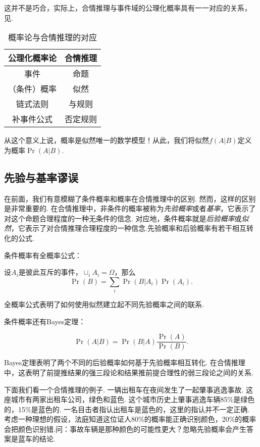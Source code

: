 这并不是巧合，实际上，合情推理与事件域的公理化概率具有一一对应的关系，见.
    \begin{table}[ht]
        \centering
        \begin{tabular}{c|c}
        公理化概率论&合情推理  \\\hline
        事件 & 命题\\
        （条件）概率 & 似然\\
        链式法则 & 与规则\\
        补事件公式 & 否定规则
        \end{tabular}
        \caption{概率论与合情推理的对应}
        \label{tab:prob}
    \end{table}

从这个意义上说，概率是似然唯一的数学模型！从此，我们将似然$f(A|B)$定义为概率$\Pr(A|B)$.

\subsection{先验与基率谬误}

在前面，我们有意模糊了条件概率和概率在合情推理中的区别. 然而，这样的区别是非常重要的. 在合情推理中，非条件的概率被称为\emph{先验概率}或者\emph{基率}，它表示了对这个命题合理程度的一种无条件的信念. 对应地，条件概率就是\emph{后验概率}或\emph{似然}，它表示了对合情推理合理程度的一种信念.先验概率和后验概率有若干相互转化的公式.

条件概率有全概率公式：
\begin{theorem}[全概率公式]
设$A_i$是彼此互斥的事件，$\cup_i A_i=\Omega$，那么
    \[\Pr(B)=\sum_{i}\Pr(B|A_i)\Pr(A_i).\]
\end{theorem}
全概率公式表明了如何使用似然建立起不同先验概率之间的联系.

条件概率还有Bayes定理：
\begin{theorem}[Bayes定理]
    \[\Pr(A|B) = \Pr(B|A)\frac{\Pr(A)}{\Pr(B)}.\]
\end{theorem}
 Bayes定理表明了两个不同的后验概率如何基于先验概率相互转化. 在合情推理中，这表明了前提推结果的强三段论和结果推前提合理性的弱三段论之间的关系.

 下面我们看一个合情推理的例子. 一辆出租车在夜间发生了一起肇事逃逸事故. 这座城市有两家出租车公司，绿色和蓝色. 这个城市历史上肇事逃逸车辆85\%是绿色的，15\%是蓝色的. 一名目击者指认出租车是蓝色的，这里的指认并不一定正确. 考虑一种理想的假设，法庭知道这位证人80\%的概率能正确识别颜色，20\%的概率会把颜色识别错.问：事故车辆是那种颜色的可能性更大？忽略先验概率会产生答案是蓝车的结论.

